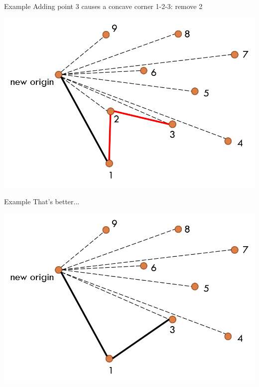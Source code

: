 \documentclass[13pt,onlymath]{beamer}
\begin{document}
\begin{frame}{Example}
Adding point 3 causes a concave corner 1-2-3: remove 2
\begin{center}
\includegraphics[height=0.5\textheight]{figures/graham3}
\end{center}
\end{frame}

\begin{frame}{Example}
That's better...
\begin{center}
\includegraphics[height=0.5\textheight]{figures/graham4}
\end{center}
\end{frame}
\end{document}

